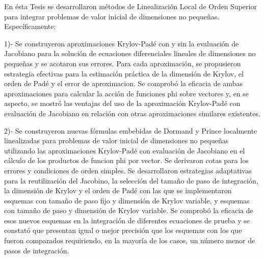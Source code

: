 \begin{conclusions}

    
    En ésta Tesis se desarrollaron métodos de Linealización Local de Orden Superior para integrar problemas de valor
    inicial de dimensiones no pequeñas. Específicamente: 

    1)- Se construyeron aproximaciones Krylov-Padé con y sin la evaluación de Jacobiano para la solución de ecuaciones diferenciales lineales de dimensiones no pequeñas y se acotaron sus errores. Para cada aproximación, se propusieron estrategia efectivas para la estimación práctica de la dimensión de Krylov, el orden de Padé y el error de aproximacion. Se comprobó la eficacia de ambas aproximaciones para calcular la acción de funciones phi sobre vectores y, en se aspecto, se mostró las ventajas del uso de la aproximación Krylov-Padé con evaluación de Jacobiano en relación con otras aproximaciones similares existentes. 
    
    
    2)- Se construyeron nuevas fórmulas embebidas de Dormand y Prince localmente linealizadas para problemas de valor inicial de dimensiones no pequeñas utilizando las aproximaciones Krylov-Padé con evaluación de Jacobiano en el cálculo de los productos de funcion phi por vector. Se derivaron cotas para los errores y condiciones de orden simples. Se  desarrollaron estrategias adaptativas para la reutilización del Jacobino, la selección del tamaño de paso de integración, la dimensión de Krylov y el orden de Padé con las que se implementaron esquemas con tamaño de paso fijo y dimensión de Krylov variable, y esquemas con tamaño de paso y dimensión de Krylov variable. Se comprobó la eficacia de esos nuevos esquemas en la integración de diferentes ecuaciones de prueba y se constató que presentan igual o mejor precisión que los esquemas con los que fueron comparados requiriendo, en la mayoría de los casos, un número menor de pasos de integración.
    

\end{conclusions}

